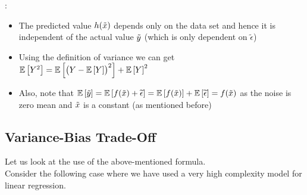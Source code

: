 \begin{mdframed}
  :
  \begin{itemize}
    \item The predicted value $h(\tilde{x})$ depends only on the data set and hence it is independent of the actual value $\tilde{y}$ (which is only dependent on $\widetilde{\epsilon}$)
    \item Using the definition of variance we can get $\mathbb{E}\left[Y^2\right] = \mathbb{E}\left[\bigl(Y-\mathbb{E}\left[Y\right]\bigr)^2\right] + \mathbb{E}\left[Y\right]^2$
    \item Also, note that $\mathbb{E}\left[\tilde{y}\right] = \mathbb{E}\left[f(\tilde{x})+\widetilde{\epsilon}\right] = \mathbb{E}\left[f(\tilde{x})\right]+\mathbb{E}\left[\widetilde{\epsilon}\right] = f(\tilde{x})$ as the noise is zero mean and $\tilde{x}$ is a constant (as mentioned before)
  \end{itemize}
\end{mdframed}

\pagebreak
\subsection{Variance-Bias Trade-Off}

Let us look at the use of the above-mentioned formula. \\

Consider the following case where we have used a very high complexity model for linear regression.

